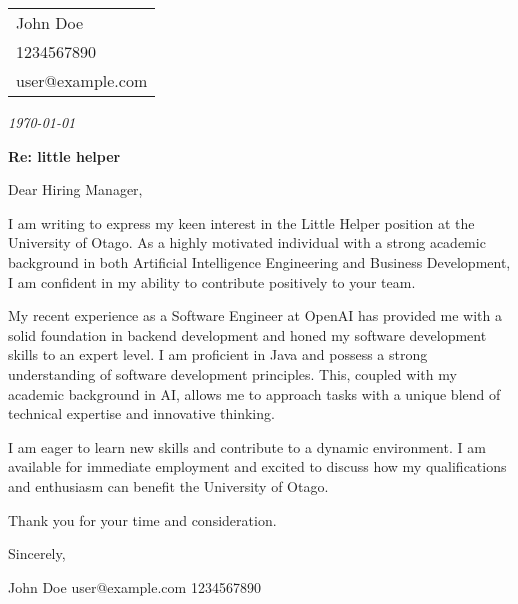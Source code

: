 \documentclass[11pt, letterpaper]{article}
\makeatletter
\newcommand{\name}{John Doe}
\newcommand{\location}{}
\newcommand{\email}{user@example.com}
\newcommand{\phone}{1234567890}
\newcommand{\jobTitle}{little helper}
\makeatother
\begin{document}
\noindent
\hfill
\begin{tabular}{@{}l@{}}
    \name \\[0.1cm]
    \phone \\
    \email \\
    \location
\end{tabular}

\vspace{0.5cm}

\noindent\textit{\today}

\vspace{0.2cm}

\noindent\textbf{Re: \jobTitle}

\vspace{0.5cm}

Dear Hiring Manager, 

\vspace{1em}
I am writing to express my keen interest in the Little Helper position at the University of Otago. As a highly motivated individual with a strong academic background in both Artificial Intelligence Engineering and Business Development, I am confident in my ability to contribute positively to your team.

\vspace{1em}
My recent experience as a Software Engineer at OpenAI has provided me with a solid foundation in backend development and honed my software development skills to an expert level. I am proficient in Java and possess a strong understanding of software development principles. This, coupled with my academic background in AI, allows me to approach tasks with a unique blend of technical expertise and innovative thinking. 

\vspace{1em}
I am eager to learn new skills and contribute to a dynamic environment.  I am available for immediate employment and excited to discuss how my qualifications and enthusiasm can benefit the University of Otago.

\vspace{1em}
Thank you for your time and consideration. 

\vspace{1em}
Sincerely,

\vspace{1em}
John Doe
user@example.com
1234567890 
\end{document}
